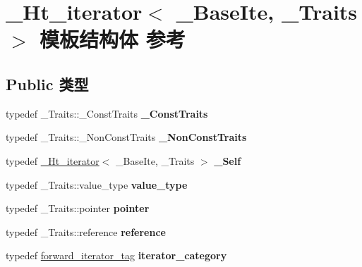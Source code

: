 \hypertarget{struct___ht__iterator}{}\section{\+\_\+\+Ht\+\_\+iterator$<$ \+\_\+\+Base\+Ite, \+\_\+\+Traits $>$ 模板结构体 参考}
\label{struct___ht__iterator}
\subsection*{Public 类型}
\begin{DoxyCompactItemize}
\item 
\mbox{\label{struct___ht__iterator_af5cd1d1a47671cd8a1b79b22d8dee5d1}} 
typedef \+\_\+\+Traits\+::\+\_\+\+Const\+Traits {\bfseries \+\_\+\+Const\+Traits}
\item 
\mbox{\label{struct___ht__iterator_a23da7a16d0f54681073ebfe8c45b77f5}} 
typedef \+\_\+\+Traits\+::\+\_\+\+Non\+Const\+Traits {\bfseries \+\_\+\+Non\+Const\+Traits}
\item 
\mbox{\label{struct___ht__iterator_a47dfd7c46f2c566b12b7c2656e79605d}} 
typedef \hyperlink{struct___ht__iterator}{\+\_\+\+Ht\+\_\+iterator}$<$ \+\_\+\+Base\+Ite, \+\_\+\+Traits $>$ {\bfseries \+\_\+\+Self}
\item 
\mbox{\label{struct___ht__iterator_acea0c2a522f4f686726ed120f42c22ad}} 
typedef \+\_\+\+Traits\+::value\+\_\+type {\bfseries value\+\_\+type}
\item 
\mbox{\label{struct___ht__iterator_a974561e2f41662b0bf28a0dd266a77f5}} 
typedef \+\_\+\+Traits\+::pointer {\bfseries pointer}
\item 
\mbox{\label{struct___ht__iterator_af0002f582b42cf2d9c756685b4998678}} 
typedef \+\_\+\+Traits\+::reference {\bfseries reference}
\item 
\mbox{\label{struct___ht__iterator_a46fc1b882d5fc7f472793e2406799174}} 
typedef \hyperlink{structforward__iterator__tag}{forward\+\_\+iterator\+\_\+tag} {\bfseries iterator\+\_\+category}

\end{DoxyCompactItemize}
